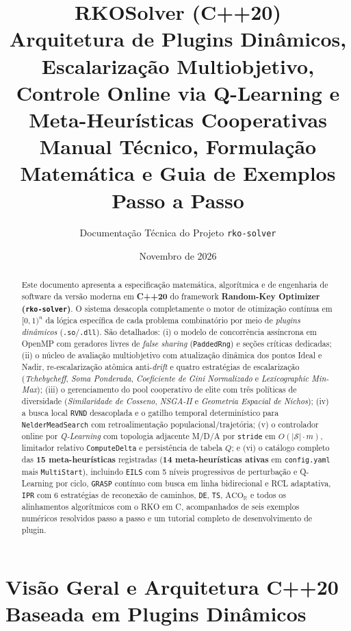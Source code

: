 \documentclass[11pt,a4paper]{article}
\title{%
  \vspace{-1.0cm}
  {\Large\bfseries\color{rkoBlue} RKOSolver (C++20)}\\[0.35cm]
  {\LARGE\bfseries Arquitetura de Plugins Dinâmicos, Escalarização Multiobjetivo,\\
  Controle Online via Q-Learning e Meta-Heurísticas Cooperativas}\\[0.25cm]
  {\normalsize Manual Técnico, Formulação Matemática e Guia de Exemplos Passo a Passo}
}
\author{Documentação Técnica do Projeto \texttt{rko-solver}}
\date{Novembro de 2026}
\begin{document}
\maketitle

\begin{abstract}
Este documento apresenta a especificação matemática, algorítmica e de engenharia de software da versão moderna em \textbf{C++20} do framework \textbf{Random-Key Optimizer (\texttt{rko-solver})}. O sistema desacopla completamente o motor de otimização contínua em $[0,1)^n$ da lógica específica de cada problema combinatório por meio de \emph{plugins dinâmicos} (\texttt{.so}/\texttt{.dll}). São detalhados: (i) o modelo de concorrência assíncrona em OpenMP com geradores livres de \emph{false sharing} (\texttt{PaddedRng}) e seções críticas dedicadas; (ii) o núcleo de avaliação multiobjetivo com atualização dinâmica dos pontos Ideal e Nadir, re-escalarização atômica anti-\emph{drift} e quatro estratégias de escalarização (\emph{Tchebycheff}, \emph{Soma Ponderada}, \emph{Coeficiente de Gini Normalizado} e \emph{Lexicographic Min-Max}); (iii) o gerenciamento do pool cooperativo de elite com três políticas de diversidade (\emph{Similaridade de Cosseno}, \emph{NSGA-II} e \emph{Geometria Espacial de Nichos}); (iv) a busca local \texttt{RVND} desacoplada e o gatilho temporal determinístico para \texttt{NelderMeadSearch} com retroalimentação populacional/trajetória; (v) o controlador online por \emph{Q-Learning} com topologia adjacente M/D/A por \texttt{stride} em $O(|\mathcal{S}|\cdot m)$, limitador relativo \texttt{ComputeDelta} e persistência de tabela $Q$; e (vi) o catálogo completo das \textbf{15 meta-heurísticas} registradas (\textbf{14 meta-heurísticas ativas} em \texttt{config.yaml} mais \texttt{MultiStart}), incluindo \texttt{EILS} com 5 níveis progressivos de perturbação e Q-Learning por ciclo, \texttt{GRASP} contínuo com busca em linha bidirecional e RCL adaptativa, \texttt{IPR} com 6 estratégias de reconexão de caminhos, \texttt{DE}, \texttt{TS}, $\text{ACO}_{\mathbb{R}}$ e todos os alinhamentos algorítmicos com o RKO em C, acompanhados de seis exemplos numéricos resolvidos passo a passo e um tutorial completo de desenvolvimento de plugin.
\end{abstract}

\tableofcontents
\newpage

\section{Visão Geral e Arquitetura C++20 Baseada em Plugins Dinâmicos}
\label{sec:arquitetura}
\end{document}
